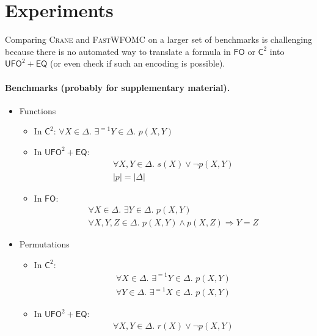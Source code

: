 \documentclass{article}
\theoremstyle{definition}
\newcommand{\Ctwo}{$\mathsf{C}^{2}$}
\newcommand{\FO}{$\mathsf{FO}$}
\newcommand{\UFO}{$\mathsf{UFO}^{2} + \mathsf{EQ}$}
\begin{document}
\section{Experiments}

Comparing \textsc{Crane} and \textsc{FastWFOMC} on a larger set of benchmarks is
challenging because there is no automated way to translate a formula in \FO{} or
\Ctwo{} into \UFO{} (or even check if such an encoding is possible).

\paragraph{Benchmarks (probably for supplementary material).}
\begin{itemize}
  \item Functions
        \begin{itemize}
          \item In \Ctwo: $\forall X \in \Delta\text{.
                }\exists^{=1} Y \in \Delta\text{. }p(X, Y)$
          \item In \UFO:
                \begin{gather*}
                  \forall X, Y \in \Delta\text{. } s(X) \lor \neg p(X, Y)\\
                  |p| = |\Delta|
                \end{gather*}
          \item In \FO:
                \begin{gather*}
                  \forall X \in \Delta\text{. }\exists Y \in \Delta\text{. } p(X, Y)\\
                  \forall X, Y, Z \in \Delta\text{. } p(X, Y) \land p(X, Z) \Rightarrow Y = Z
                \end{gather*}
        \end{itemize}
  \item Permutations
        \begin{itemize}
          \item In \Ctwo:
                \begin{gather*}
                  \forall X \in \Delta\text{. }\exists^{=1} Y \in \Delta\text{. }p(X, Y)\\
                  \forall Y \in \Delta\text{. }\exists^{=1} X \in \Delta\text{. }p(X, Y)
                \end{gather*}
          \item In \UFO:
                \begin{gather*}
                  \forall X, Y \in \Delta\text{. } r(X) \lor \neg p(X, Y)\\

\end{gather*}
\end{itemize}
\end{itemize}
\end{document}
